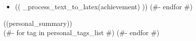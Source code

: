 \documentclass[10pt,a4paper,ragged2e,withhyper]{altacv}
\begin{document}
\begin{paracol}{2}
    \medskip


    \smallskip
    \begin{itemize}
        (#- for achievement in achievements_list #)
            \item (( _process_text_to_latex(achievement) ))
        (#- endfor #)
    \end{itemize}
    \medskip

    \smallskip
    ((personal_summary))\\
     (#- for tag in personal_tags_list #)  (#- endfor #)


  \end{paracol}
\end{document}
